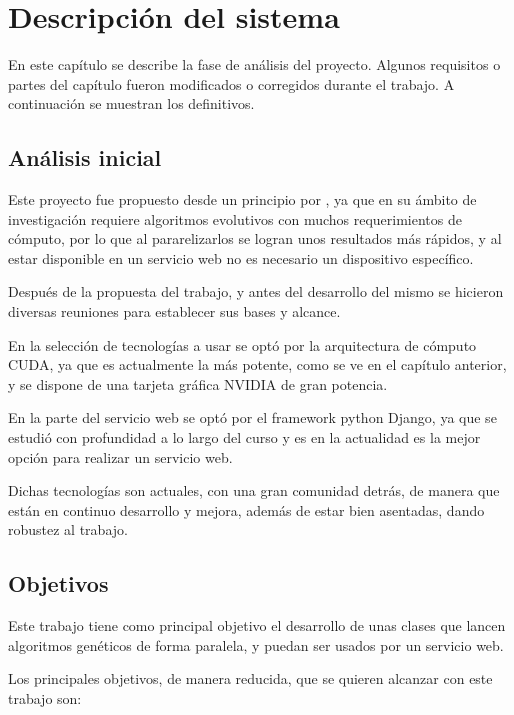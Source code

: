 \chapter{Descripción del sistema}

\bigskip
En este capítulo se describe la fase de análisis del proyecto. Algunos requisitos o partes del capítulo fueron modificados o corregidos durante el trabajo. A continuación se muestran los definitivos.

\bigskip
\section{Análisis inicial}

Este proyecto fue propuesto desde un principio por {\tutor}, ya que en su ámbito de investigación requiere algoritmos evolutivos con muchos requerimientos de cómputo, por lo que al  pararelizarlos se logran unos resultados más rápidos, y al estar disponible en un servicio web no es necesario un dispositivo específico.

Después de la propuesta del trabajo, y antes del desarrollo del mismo se hicieron diversas reuniones para establecer sus bases y alcance. 

En la selección de tecnologías a usar se optó por la arquitectura de cómputo CUDA, ya que es actualmente la más potente, como se ve en el capítulo anterior, y se dispone de una tarjeta gráfica NVIDIA de gran potencia.

En la parte del servicio web se optó por el framework python Django, ya que se estudió con profundidad a lo largo del curso y es en la actualidad es la mejor opción para realizar un servicio web.

Dichas tecnologías son actuales, con una gran comunidad detrás, de manera que están en continuo desarrollo y mejora, además de estar bien asentadas, dando robustez al trabajo.


\newpage
\section{Objetivos}

Este trabajo tiene como principal objetivo el desarrollo de unas clases que lancen algoritmos genéticos de forma paralela, y puedan ser usados por un servicio web.

Los principales objetivos, de manera reducida, que se quieren alcanzar con este trabajo son:


